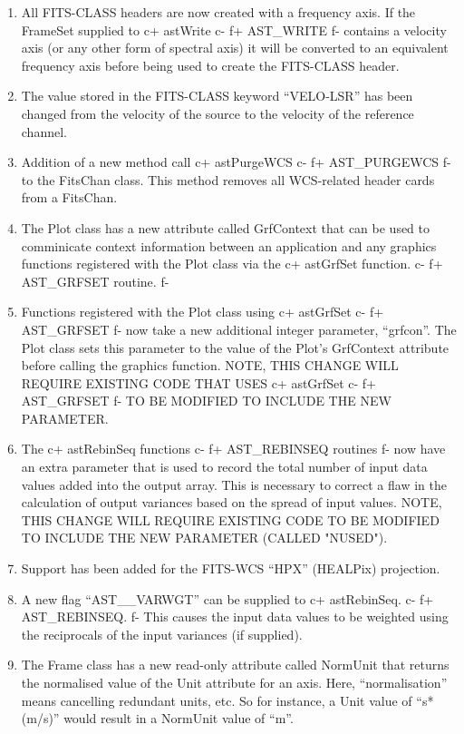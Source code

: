 \documentclass[twoside,11pt]{article}
\begin{document}
\begin{enumerate}



\item All FITS-CLASS headers are now created with a frequency axis. If the
FrameSet supplied to 
c+
astWrite
c-
f+
AST\_WRITE
f-
contains a velocity axis (or any other form
of spectral axis) it will be converted to an equivalent frequency axis
before being used to create the FITS-CLASS header.

\item The value stored in the FITS-CLASS keyword ``VELO-LSR'' has been changed
from the velocity of the source to the velocity of the reference channel.

\item Addition of a new method call 
c+
astPurgeWCS
c-
f+
AST\_PURGEWCS
f-
to the FitsChan 
class. This method removes all WCS-related header cards from a FitsChan.

\item The Plot class has a new attribute called GrfContext that can be used
to comminicate context information between an application and any
graphics functions registered with the Plot class via the 
c+
astGrfSet function.
c-
f+
AST\_GRFSET routine.
f-
\item Functions registered with the Plot class using 
c+
astGrfSet 
c-
f+
AST\_GRFSET
f-
now take a new additional integer parameter, ``grfcon''. The Plot class
sets this parameter to the value of the Plot's GrfContext attribute before
calling the graphics function. NOTE, THIS CHANGE WILL REQUIRE EXISTING 
CODE THAT USES 
c+
astGrfSet 
c-
f+
AST\_GRFSET
f-
TO BE MODIFIED TO INCLUDE THE NEW PARAMETER.
\item The 
c+
astRebinSeq functions
c-
f+
AST\_REBINSEQ routines
f-
now have an extra parameter that is used to record the total number of input 
data values added into the output array. This is necessary to correct a 
flaw in the calculation of output variances based on the spread of input 
values. NOTE, THIS CHANGE WILL REQUIRE EXISTING CODE TO BE MODIFIED TO 
INCLUDE THE NEW PARAMETER (CALLED "NUSED").
\item Support has been added for the FITS-WCS ``HPX'' (HEALPix) projection.
\item A new flag ``AST\_\_VARWGT'' can be supplied to 
c+
astRebinSeq.
c-
f+
AST\_REBINSEQ.
f-
This causes the input data values to be weighted using the reciprocals of 
the input variances (if supplied).

\item The Frame class has a new read-only attribute called NormUnit that
returns the normalised value of the Unit attribute for an axis. Here,
``normalisation'' means cancelling redundant units, etc. So for instance, a
Unit value of ``s*(m/s)'' would result in a NormUnit value of ``m''.


\end{enumerate}
\end{document}
